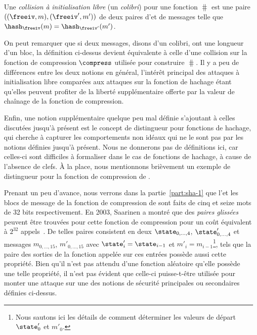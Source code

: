 \begin{fdefi}
Une \emph{collision à initialisation libre} (un \emph{colibri})
pour une fonction \merkdam 
$\hash$ est une paire $((\freeiv,m), (\freeiv',m'))$
de deux paires d'\iv et de messages telle que $\hash_\freeiv(m) = \hash_{\freeiv'}(m')$.
\end{fdefi}

On peut remarquer que si deux messages, disons d'un colibri, ont une longueur d'un bloc, la définition ci-dessus devient équivalente à celle
d'une collision sur la fonction de compression
$\compress$ utilisée pour construire $\hash$.
Il y a peu de différences entre les deux notions en général, l'intérêt principal des
attaques à initialisation libre comparées aux attaques sur la fonction de hachage étant qu'elles
peuvent profiter de la liberté supplémentaire offerte par la valeur de chaînage de la fonction de compression.

\bigskip

Enfin, une notion supplémentaire quelque peu mal définie s'ajoutant à celles discutées jusqu'à présent est le concept de distingueur pour fonctions de hachage,
qui cherche à capturer les comportements non idéaux qui ne le sont pas par les notions définies jusqu'à présent. Nous ne donnerons pas de définitions ici,
car celles-ci sont difficiles à formaliser dans le cas de fonctions de hachage, à cause de l'absence de clefs. À la place, nous mentionnons brièvement
un exemple de distingueur pour la fonction de compression de \shaone. 

Prenant un peu d'avance, nous verrons dans la partie~\ref{part:sha-1} que l'\iv et les blocs de message  de la fonction
de compression de \shaone sont faits de cinq et seize mots de 32 bits respectivement.
En 2003, Saarinen a montré que des \emph{paires glissées} peuvent être trouvées pour cette fonction de compression pour un coût
équivalent à $2^{32}$ appels~\cite{DBLP:conf/fse/Saarinen03}.
De telles paires consistent en deux
\ivs $\state_{0,\ldots,4}$, $\state'_{0,\ldots,4}$ et messages $m_{0,\ldots,15}$,
$m'_{0,\ldots,15}$ avec $\state'_i = \state_{i-1}$ et $m'_i = m_{i-1}$\footnote{Nous sautons ici les détails de comment déterminer les valeurs de départ
$\state'_0$ et $m'_0$.}, tels que la paire des sorties de la fonction appelée sur ces entrées possède aussi cette propriété.
Bien qu'il n'est pas attendu d'une fonction aléatoire qu'elle possède une telle propriété,
il n'est pas évident que celle-ci puisse-t-être 
 utilisée pour monter
une attaque sur une des notions de sécurité principales ou secondaires définies ci-dessus.


